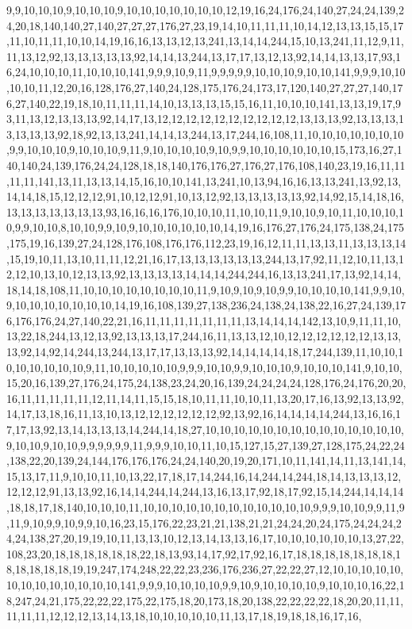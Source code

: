 9,9,10,10,10,9,10,10,10,9,10,10,10,10,10,10,10,12,19,16,24,176,24,140,27,24,24,139,24,20,18,140,140,27,140,27,27,27,176,27,23,19,14,10,11,11,11,10,14,12,13,13,15,15,17,11,10,11,11,10,10,14,19,16,16,13,13,12,13,241,13,14,14,244,15,10,13,241,11,12,9,11,11,13,12,92,13,13,13,13,13,92,14,14,13,244,13,17,17,13,12,13,92,14,14,13,13,17,93,16,24,10,10,10,11,10,10,10,141,9,9,9,10,9,11,9,9,9,9,9,10,10,10,9,10,10,141,9,9,9,10,10,10,10,11,12,20,16,128,176,27,140,24,128,175,176,24,173,17,120,140,27,27,27,140,176,27,140,22,19,18,10,11,11,11,14,10,13,13,13,15,15,16,11,10,10,10,141,13,13,19,17,93,11,13,12,13,13,13,92,14,17,13,12,12,12,12,12,12,12,12,12,12,13,13,13,92,13,13,13,13,13,13,13,92,18,92,13,13,241,14,14,13,244,13,17,244,16,108,11,10,10,10,10,10,10,10,9,9,10,10,10,9,10,10,10,9,11,9,10,10,10,10,9,10,9,9,10,10,10,10,10,10,15,173,16,27,140,140,24,139,176,24,24,128,18,18,140,176,176,27,176,27,176,108,140,23,19,16,11,11,11,11,141,13,11,13,13,14,15,16,10,10,141,13,241,10,13,94,16,16,13,13,241,13,92,13,14,14,18,15,12,12,12,91,10,12,12,91,10,13,12,92,13,13,13,13,13,92,14,92,15,14,18,16,13,13,13,13,13,13,13,93,16,16,16,176,10,10,10,11,10,10,11,9,10,10,9,10,11,10,10,10,10,9,9,10,10,8,10,10,9,9,10,9,10,10,10,10,10,10,14,19,16,176,27,176,24,175,138,24,175,175,19,16,139,27,24,128,176,108,176,176,112,23,19,16,12,11,11,13,13,11,13,13,13,14,15,19,10,11,13,10,11,11,12,21,16,17,13,13,13,13,13,13,244,13,17,92,11,12,10,11,13,12,12,10,13,10,12,13,13,92,13,13,13,13,14,14,14,244,244,16,13,13,241,17,13,92,14,14,18,14,18,108,11,10,10,10,10,10,10,10,10,11,9,10,9,10,9,10,9,9,10,10,10,10,141,9,9,10,9,10,10,10,10,10,10,10,14,19,16,108,139,27,138,236,24,138,24,138,22,16,27,24,139,176,176,176,24,27,140,22,21,16,11,11,11,11,11,11,11,13,14,14,14,142,13,10,9,11,11,10,13,22,18,244,13,12,13,92,13,13,13,17,244,16,11,13,13,12,10,12,12,12,12,12,12,13,13,13,92,14,92,14,244,13,244,13,17,17,13,13,13,92,14,14,14,14,18,17,244,139,11,10,10,10,10,10,10,10,10,9,11,10,10,10,10,10,9,9,9,10,10,9,9,10,10,10,9,10,10,10,141,9,10,10,15,20,16,139,27,176,24,175,24,138,23,24,20,16,139,24,24,24,24,128,176,24,176,20,20,16,11,11,11,11,11,12,11,14,11,15,15,18,10,11,11,10,10,11,13,20,17,16,13,92,13,13,92,14,17,13,18,16,11,13,10,13,12,12,12,12,12,12,92,13,92,16,14,14,14,14,244,13,16,16,17,17,13,92,13,14,13,13,13,14,244,14,18,27,10,10,10,10,10,10,10,10,10,10,10,10,10,10,9,10,10,9,10,10,9,9,9,9,9,9,11,9,9,9,10,10,11,10,15,127,15,27,139,27,128,175,24,22,24,138,22,20,139,24,144,176,176,176,24,24,140,20,19,20,171,10,11,141,14,11,13,141,14,15,13,17,11,9,10,10,11,10,13,22,17,18,17,14,244,16,14,244,14,244,18,14,13,13,13,12,12,12,12,91,13,13,92,16,14,14,244,14,244,13,16,13,17,92,18,17,92,15,14,244,14,14,14,18,18,17,18,140,10,10,10,11,10,10,10,10,10,10,10,10,10,10,10,10,9,9,9,10,10,9,9,11,9,11,9,10,9,9,10,9,9,10,16,23,15,176,22,23,21,21,138,21,21,24,24,20,24,175,24,24,24,24,24,138,27,20,19,19,10,11,13,13,10,12,13,14,13,13,16,17,10,10,10,10,10,10,13,27,22,108,23,20,18,18,18,18,18,18,22,18,13,93,14,17,92,17,92,16,17,18,18,18,18,18,18,18,18,18,18,18,18,19,19,247,174,248,22,22,23,236,176,236,27,22,22,27,12,10,10,10,10,10,10,10,10,10,10,10,10,10,141,9,9,9,10,10,10,10,9,9,10,9,10,10,10,10,9,10,10,10,16,22,18,247,24,21,175,22,22,22,175,22,175,18,20,173,18,20,138,22,22,22,22,18,20,20,11,11,11,11,11,12,12,12,13,14,13,18,10,10,10,10,10,11,13,17,18,19,18,18,16,17,16,